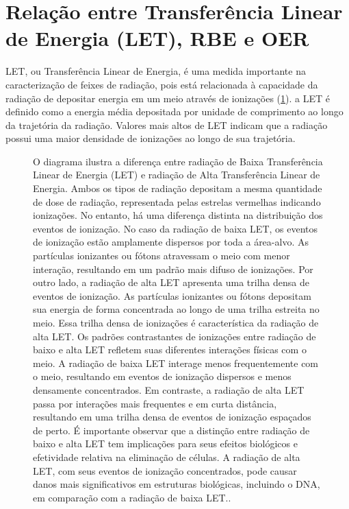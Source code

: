 \documentclass[11pt,a4paper]{article}
\begin{document}
\section{Relação entre Transferência Linear de Energia (LET), RBE e OER}

	LET, ou Transferência Linear de Energia, é uma medida importante na caracterização de feixes de radiação, pois está relacionada à capacidade da radiação de depositar energia em um meio através de ionizações (\ref{fig:efeitoLetAltaEBaixe}). a LET é definido como a energia média depositada por unidade de comprimento ao longo da trajetória da radiação. Valores mais altos de LET indicam que a radiação possui uma maior densidade de ionizações ao longo de sua trajetória.

	\begin{figure}[!h]
		\centering
		\caption{O diagrama ilustra a diferença entre radiação de Baixa Transferência Linear de Energia (LET) e radiação de Alta Transferência Linear de Energia. Ambos os tipos de radiação depositam a mesma quantidade de dose de radiação, representada pelas estrelas vermelhas indicando ionizações. No entanto, há uma diferença distinta na distribuição dos eventos de ionização. No caso da radiação de baixa LET, os eventos de ionização estão amplamente dispersos por toda a área-alvo. As partículas ionizantes ou fótons atravessam o meio com menor interação, resultando em um padrão mais difuso de ionizações. Por outro lado, a radiação de alta LET apresenta uma trilha densa de eventos de ionização. As partículas ionizantes ou fótons depositam sua energia de forma concentrada ao longo de uma trilha estreita no meio. Essa trilha densa de ionizações é característica da radiação de alta LET. Os padrões contrastantes de ionizações entre radiação de baixo e alta LET refletem suas diferentes interações físicas com o meio. A radiação de baixa LET interage menos frequentemente com o meio, resultando em eventos de ionização dispersos e menos densamente concentrados. Em contraste, a radiação de alta LET passa por interações mais frequentes e em curta distância, resultando em uma trilha densa de eventos de ionização espaçados de perto. É importante observar que a distinção entre radiação de baixo e alta LET tem implicações para seus efeitos biológicos e efetividade relativa na eliminação de células. A radiação de alta LET, com seus eventos de ionização concentrados, pode causar danos mais significativos em estruturas biológicas, incluindo o DNA, em comparação com a radiação de baixa LET..}
		\label{fig:efeitoLetAltaEBaixe}
	\end{figure}
\end{document}
